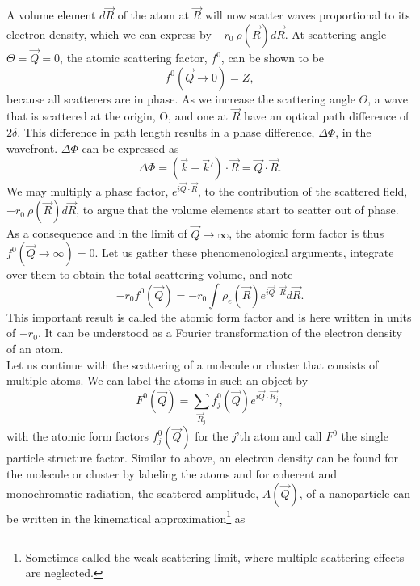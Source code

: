 %
A volume element $d\vec{R}$ of the atom at $\vec{R}$ will now scatter waves proportional to its electron density, which we can express by $-r_{0}\ \rho\left(\vec{R}\right)d\vec{R}$. At scattering angle $\Theta=\vec{Q}=0$, the atomic scattering factor, $f^{0}$, can be shown to be
\begin{equation}
f^{0}\left(\vec{Q}\rightarrow 0\right)=Z,
\label{eq:transform-number-of-particles}
\end{equation}
because all scatterers are in phase. As we increase the scattering angle $\Theta$, a wave that is scattered at the origin, O, and one at $\vec{R}$ have an optical path difference of $2 \delta$. This difference in path length results in a phase difference, $\Delta \Phi$, in the wavefront. $\Delta \Phi$ can be expressed as 
\begin{equation}
\Delta \Phi = \left(\vec{k}-\vec{k}'\right)\cdot \vec{R} = \vec{Q}\cdot \vec{R}.
\label{eq:phase-difference}
\end{equation}
We may multiply a phase factor, $e^{i \vec{Q}\cdot \vec{R}}$, to the contribution of the scattered field, $-r_{0}\ \rho\left(\vec{R}\right)d\vec{R}$, to argue that the volume elements start to scatter out of phase. As a consequence and in the limit of $\vec{Q}\rightarrow\infty$, the atomic form factor is thus $f^{0}\left(\vec{Q}\rightarrow\infty\right)=0$. Let us gather these phenomenological arguments, integrate over them to obtain the total scattering volume, and note
\begin{equation}
-r_{0} f^{0}\left(\vec{Q}\right)=-r_{0}\int\rho_{e}\left(\vec{R}\right)e^{i \vec{Q}\cdot \vec{R}}d\vec{R}.
\label{eq:scattering-integral}
\end{equation}
This important result is called the atomic form factor and is here written in units of $-r_{0}$. It can be understood as a Fourier transformation of the electron density of an atom.\\[1\baselineskip]
%
Let us continue with the scattering of a molecule or cluster that consists of multiple atoms. We can label the atoms in such an object by
\begin{equation}
F^{0}\left(\vec{Q}\right)=\sum_{\vec{R}_j}f_{j}^{0}\left(\vec{Q}\right)e^{i \vec{Q}\cdot \vec{R_{j}}},
\label{eq:scattering-factor-object}
\end{equation}
with the atomic form factors $f_{j}^{0}\left(\vec{Q}\right)$ for the $j$'th atom and call $F^{0}$ the single particle structure factor. Similar to above, an electron density can be found for the molecule or cluster by labeling the atoms \citep{Vartanyants-2001-JOP} and for coherent and monochromatic radiation, the scattered amplitude, $A(\vec{Q})$, of a nanoparticle can be written in the kinematical approximation\footnote{Sometimes called the weak-scattering limit, where multiple scattering effects are neglected.} as 
